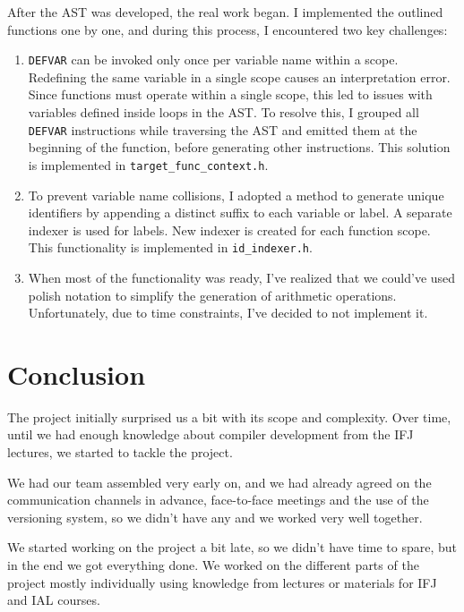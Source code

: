 \documentclass[a4paper, 11pt]{article}
\begin{document}
        After the AST was developed, the real work began. I implemented the outlined functions one by one, and during this process, I encountered two key challenges:
        
        \begin{enumerate}
            \item \texttt{DEFVAR} can be invoked only once per variable name within a scope. Redefining the same variable in a single scope causes an interpretation error. Since functions must operate within a single scope, this led to issues with variables defined inside loops in the AST. To resolve this, I grouped all \texttt{DEFVAR} instructions while traversing the AST and emitted them at the beginning of the function, before generating other instructions. This solution is implemented in \texttt{target\_func\_context.h}.
            \item To prevent variable name collisions, I adopted a method to generate unique identifiers by appending a distinct suffix to each variable or label. A separate indexer is used for labels. New indexer is created for each function scope. This functionality is implemented in \texttt{id\_indexer.h}.
            \item When most of the functionality was ready, I've realized that we could've used polish notation to simplify the generation of arithmetic operations. Unfortunately, due to time constraints, I've decided to not implement it.
        \end{enumerate}

	\section{Conclusion}

	The project initially surprised us a bit with its scope and complexity. Over time, until we had enough
	knowledge about compiler development from the IFJ lectures, we started to tackle the project.

	We had our team assembled very early on, and we had already agreed on the communication channels in advance,
	face-to-face meetings and the use of the versioning system, so we didn't have any
	and we worked very well together.

	We started working on the project a bit late, so we didn't have time to spare, but in the end
	we got everything done. We worked on the different parts of the project mostly individually using
	knowledge from lectures or materials for IFJ and IAL courses.
\end{document}
